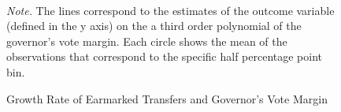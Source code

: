 \documentclass[dv_diss_main.tex]{subfiles}
\begin{document}
\begin{figure}[h]
	\begin{center}
    	\\
        \caption{Growth Rate of Earmarked Transfers and Governor's Vote Margin}\label{fig:rddplotearmarks}
	\end{center}
    \vspace{0.5em}
    \begin{figurenotes}
    \footnotesize	
	\textit{Note. }The lines correspond to the estimates of the outcome variable  (defined in the y axis) on the a third order polynomial of the governor's vote margin. Each circle shows the mean of the observations that correspond to the specific half percentage point bin. 
	\end{figurenotes}

\end{figure}
\end{document}
